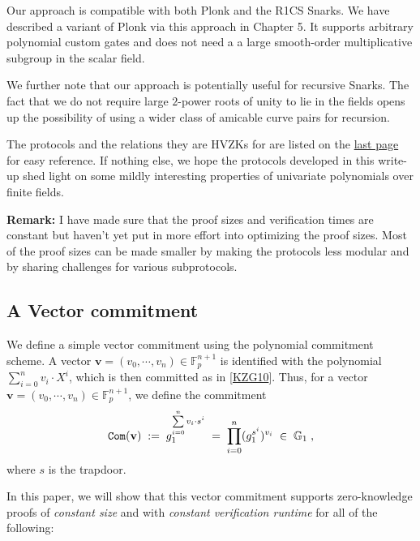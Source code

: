 \documentclass[11pt, lettersize, notitlepage, leqno, footskip=0.6cm]{article}
\newcommand{\bFp}{\mathbb{F}_p}
\newcommand{\mb}{\mathbb}
\newcommand{\mbf}{\mathbf}
\newcommand{\vs}{\vspace{-0.15cm}}
\newcommand{\noin}{\noindent}
\numberwithin{equation}{section}
\begin{document}
Our approach is compatible with both Plonk and the R1CS Snarks. We have described a variant of Plonk via this approach in Chapter 5. It supports arbitrary polynomial custom gates and does not need a a large smooth-order multiplicative subgroup in the scalar field. 

We further note that our approach is potentially useful for recursive Snarks. The fact that we do not require large $2$-power roots of unity to lie in the fields opens up the possibility of using a wider class of amicable curve pairs for recursion.


The protocols and the relations they are HVZKs for are listed on the \hyperlink{Protocol List}{last page} for easy reference. If nothing else, we hope the protocols developed in this write-up shed light on some mildly interesting properties of univariate polynomials over finite fields.



\bigskip

\noin \textbf{Remark:} I have made sure that the proof sizes and verification times are constant but haven't yet put in more effort into optimizing the proof sizes. Most of the proof sizes can be made smaller by making the protocols less modular and by sharing challenges for various subprotocols. 
 







\subsection{\fontsize{11}{11}\selectfont A Vector commitment}

We define a simple vector commitment using the polynomial commitment scheme. A vector $\mbf{v}= (v_0,\cdots,v_n)\in \bFp^{n+1}$ is identified with the polynomial $\sum\limits_{i=0}^{n} v_i\cdot X^i$, which is then committed as in [\hyperlink{KZG}{\hyperlink{KZG}{\hyperlink{KZG}{KZG10}}}]. Thus, for a vector $\mbf{v}= (v_0,\cdots,v_n)\in \bFp^{n+1}$, we define the commitment \vs $$ {\tt{Com}}(\mbf{v}) \;:=\; g_1^{\sum\limits_{i=0}^{n} v_i\cdot s^i} \;=\; \prod\limits_{i=0}^n (g_1^{s^i})^{v_i}\;\in\; \mb{G}_1\;,  \vs $$ where $s$ is the trapdoor. \vspace{2mm}

In this paper, we will show that this vector commitment supports zero-knowledge proofs of \textit{constant size} and with \textit{constant verification runtime} for all of the following: \vspace{2mm}
\end{document}
